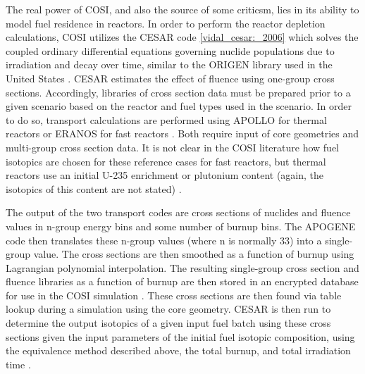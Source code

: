 The real power of COSI, and also the source of some criticsm, lies in its
ability to model fuel residence in reactors. In order to perform the reactor
depletion calculations, COSI utilizes the CESAR code \ref{vidal_cesar:_2006}
which solves the coupled ordinary differential equations governing nuclide
populations due to irradiation and decay over time, similar to the ORIGEN
library used in the United States \cite{bell_origen_1973}. CESAR estimates the
effect of fluence using one-group cross sections. Accordingly, libraries of
cross section data must be prepared prior to a given scenario based on the
reactor and fuel types used in the scenario. In order to do so, transport
calculations are performed using APOLLO \cite{santamarina_2009_apollo2} for
thermal reactors or ERANOS for fast reactors \cite{ruggieri_2006_eranos}. Both
require input of core geometries and multi-group cross section data. It is not
clear in the COSI literature how fuel isotopics are chosen for these reference
cases for fast reactors, but thermal reactors use an initial U-235 enrichment or
plutonium content (again, the isotopics of this content are not
stated) \cite{guerin_benchmark_2009}.

The output of the two transport codes are cross sections of nuclides and fluence
values in n-group energy bins and some number of burnup bins. The APOGENE code
then translates these n-group values (where n is normally 33) into a
single-group value. The cross sections are then smoothed as a function of burnup
using Lagrangian polynomial interpolation. The resulting single-group cross
section and fluence libraries as a function of burnup are then stored in an
encrypted database for use in the COSI
simulation \cite{atabekjana_2012_analysis}. These cross sections are then found
via table lookup during a simulation using the core geometry. CESAR is then run
to determine the output isotopics of a given input fuel batch using these cross
sections given the input parameters of the initial fuel isotopic composition,
using the equivalence method described above, the total burnup, and total
irradiation time \cite{coquelet-pascal_validation_2011}. 
